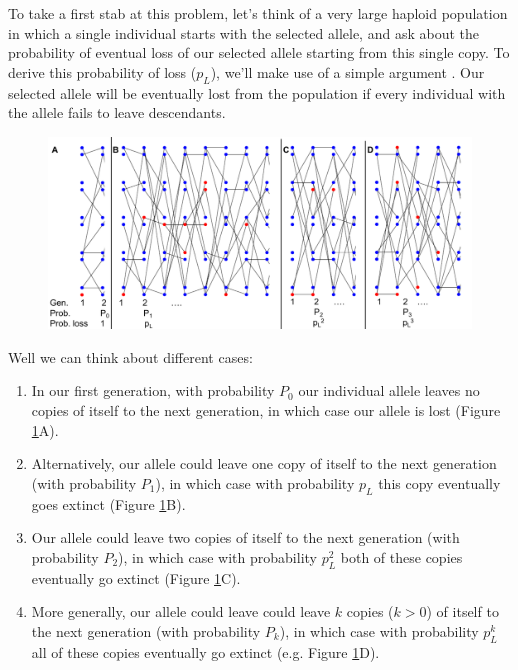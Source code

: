 To take a first stab at this problem, let's think of a very large
haploid population in which a single individual starts with the selected allele, and ask
about the probability of eventual loss of our selected allele starting
from this single copy. To derive this probability of loss ($p_L$), we'll make use of a
simple argument \citep[derived from branching processes][]{fisher1923xxi,haldane1927mathematical}. Our selected
allele will be eventually lost from the population if every individual
with the allele fails to leave descendants.
\begin{figure}
\begin{center}
\includegraphics[width=0.9 \textwidth]{figures/Proof_of_pL_2s.pdf}
\end{center}
\caption{} \label{fig:Proof_of_pL_2s}
\end{figure}
Well we can think about different cases: 
\begin{enumerate}
\item In our first generation,
with probability $P_0$ our individual allele leaves no copies of itself to
the next generation, in which case our allele is lost (Figure \ref{fig:Proof_of_pL_2s}A).
\item Alternatively,
our allele could leave one copy of itself to the next generation (with
probability $P_1$), in which
case with probability $p_L$ this copy eventually goes extinct (Figure \ref{fig:Proof_of_pL_2s}B).
\item Our allele could leave two copies of itself to the next generation (with
probability $P_2$), in which
case with probability $p_L^2$ both of these copies eventually go
extinct (Figure \ref{fig:Proof_of_pL_2s}C).
\item More generally, our allele could leave could leave $k$ copies ($k>0$) of itself to the next generation (with
probability $P_k$), in which case with probability $p_L^k$  all of
these copies eventually go extinct (e.g. Figure \ref{fig:Proof_of_pL_2s}D).
\end{enumerate}
